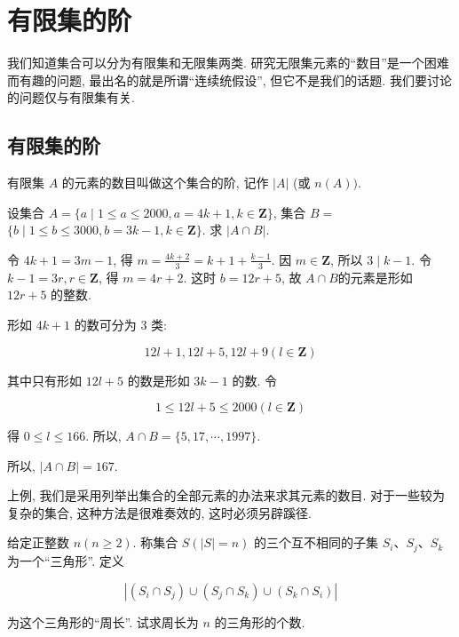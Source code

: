 \section{有限集的阶}
我们知道集合可以分为有限集和无限集两类. 研究无限集元素的“数目”是一个困难而有趣的问题, 最出名的就是所谓“连续统假设”, 但它不是我们的话题. 我们要讨论的问题仅与有限集有关.
\subsection{有限集的阶}
有限集 $A$ 的元素的数目叫做这个集合的阶, 记作 $|A|$ (或 $n(A))$.
\begin{example}
	设集合 $A=\{a \mid 1 \leqslant a \leqslant 2000, a=4 k+1, k \in \mathbf{Z}\}$, 集合 $B=$ $\{b \mid 1 \leqslant b \leqslant 3000, b=3 k-1, k \in \mathbf{Z}\}$. 求 $|A \cap B|$.
\end{example}

\begin{analysis}
	令 $4 k+1=3 m-1$, 得 $m=\frac{4 k+2}{3}=k+1+\frac{k-1}{3}$. 因 $m \in \mathbf{Z}$, 所以 $3 \mid k-1$. 令 $k-1=3 r, r \in \mathbf{Z}$, 得 $m=4 r+2$. 这时 $b=12 r+5$, 故 $A \cap B$的元素是形如 $12 r+5$ 的整数.
\end{analysis}

\begin{solution}
	形如 $4 k+1$ 的数可分为 3 类:

	$$
		12 l+1,12 l+5,12 l+9(l \in \mathbf{Z})
	$$

	其中只有形如 $12 l+5$ 的数是形如 $3 k-1$ 的数. 令

	$$
		1 \leqslant 12 l+5 \leqslant 2000(l \in \mathbf{Z})
	$$

	得 $0 \leqslant l \leqslant 166$. 所以, $A \cap B=\{5,17, \cdots, 1997\}$.

	所以, $|A \cap B|=167$.
\end{solution}

\begin{note}
	上例, 我们是采用列举出集合的全部元素的办法来求其元素的数目. 对于一些较为复杂的集合, 这种方法是很难奏效的, 这时必须另辟蹊径.
\end{note}

\begin{example}
	给定正整数 $n(n \geqslant 2)$. 称集合 $S(|S|=n)$ 的三个互不相同的子集 $S_{i} 、 S_{j} 、 S_{k}$ 为一个“三角形”. 定义

	$$
		\left|\left(S_{i} \cap S_{j}\right) \cup\left(S_{j} \cap S_{k}\right) \cup\left(S_{k} \cap S_{i}\right)\right|
	$$

	为这个三角形的“周长”. 试求周长为 $n$ 的三角形的个数.
\end{example}

